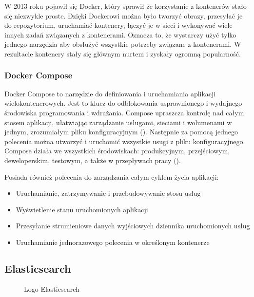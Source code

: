 W 2013 roku pojawił się Docker, który sprawił że korzystanie z kontenerów stało się niezwykle proste. Dzięki Dockerowi można było tworzyć obrazy, przesyłać je do repozytorium, uruchamiać kontenery, łączyć je w sieci i wykonywać wiele innych zadań związanych z kontenerami. Oznacza to, że wystarczy użyć tylko jednego narzędzia aby obsłużyć wszystkie potrzeby związane z kontenerami. W rezultacie kontenery stały się głównym nurtem i zyskały ogromną popularność\cite{dockerContenerizationKeyAndUseCases}\cite{dockerOverview}.

\subsubsection{Docker Compose}

Docker Compose to narzędzie do definiowania i uruchamiania aplikacji wielokontenerowych. Jest to klucz do odblokowania usprawnionego i wydajnego środowiska programowania i wdrażania.
Compose upraszcza kontrolę nad całym stosem aplikacji, ułatwiając zarządzanie usługami, sieciami i wolumenami w jednym, zrozumiałym pliku konfiguracyjnym  (). Następnie za pomocą jednego polecenia można utworzyć i uruchomić wszystkie usugi z pliku konfiguracyjnego. Compose działa we wszystkich środowiskach: produkcyjnym, przejściowym, deweloperskim, testowym, a także w przepływach pracy  ()\cite{dockerComposeAStudyMultiContainerSystem}\cite{dockerComposeOverview}\cite{dockerComposePaterns}.

Posiada również polecenia do zarządzania całym cyklem życia aplikacji: 
\begin{itemize}
    \item Uruchamianie, zatrzymywanie i przebudowywanie stosu usług
    \item Wyświetlenie stanu uruchomionych aplikacji
    \item Przesyłanie strumieniowe danych wyjściowych dziennika uruchomionych usług
    \item Uruchamianie jednorazowego polecenia w określonym kontenerze
\end{itemize}

\subsection{Elasticsearch}

\begin{figure}[!htbp]
    \centering
    
    \caption{Logo Elasticsearch \cite{elasticSearchManualDataIn}}
    \label{fig:enter-label}
\end{figure}

